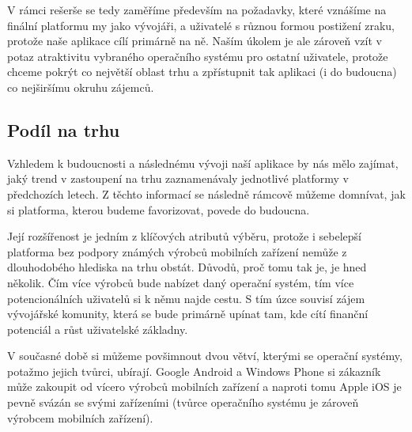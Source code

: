 \documentclass[thesis=M,czech]{FITthesis}[2012/06/26]
\begin{document}
V rámci rešerše se tedy zaměříme především na požadavky, které vznášíme na finální platformu my jako vývojáři, a uživatelé s různou formou postižení zraku, protože naše aplikace cílí primárně na ně. Naším úkolem je ale zároveň vzít v potaz atraktivitu vybraného operačního systému pro ostatní uživatele, protože chceme pokrýt co největší oblast trhu a zpřístupnit tak aplikaci (i do budoucna) co nejširšímu okruhu zájemců.

\subsection{Podíl na trhu}
Vzhledem k budoucnosti a následnému vývoji naší aplikace by nás mělo zajímat, jaký trend v zastoupení na trhu zaznamenávaly jednotlivé platformy v předchozích letech. Z těchto informací se následně rámcově můžeme domnívat, jak si platforma, kterou budeme favorizovat, povede do budoucna.

Její rozšířenost je jedním z klíčových atributů výběru, protože i sebelepší platforma bez podpory známých výrobců mobilních zařízení nemůže z dlouhodobého hlediska na trhu obstát. Důvodů, proč tomu tak je, je hned několik. Čím více výrobců bude nabízet daný operační systém, tím více potencionálních uživatelů si k němu najde cestu. S tím úzce souvisí zájem vývojářské komunity, která se bude primárně upínat tam, kde cítí finanční potenciál a růst uživatelské základny.

V současné době si můžeme povšimnout dvou větví, kterými se operační systémy, potažmo jejich tvůrci, ubírají. Google Android a Windows Phone si zákazník může zakoupit od vícero výrobců mobilních zařízení a naproti tomu Apple iOS je pevně svázán se svými zařízeními (tvůrce operačního systému je zároveň výrobcem mobilních zařízení).
\end{document}
